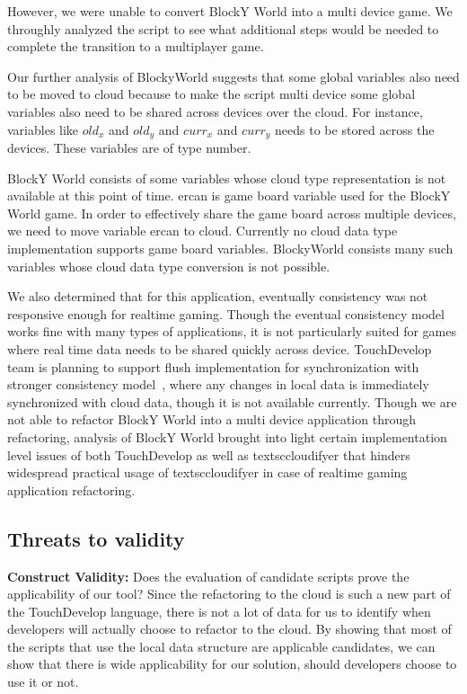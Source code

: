\documentclass{sigplanconf}
\begin{document}
However, we were unable to convert BlockY World into a multi device game.  We throughly analyzed the script to see what additional steps would be needed to complete the transition to a multiplayer game.

Our further analysis of BlockyWorld suggests that some global variables also need to be moved to cloud because to make the script multi device some global variables also need to be shared across devices over the cloud. For instance, variables like $old_x$ and $old_y$ and $curr_x$ and $curr_y$ needs to be stored across the devices. These variables are of type number.  

BlockY World consists of some variables whose cloud type representation is not available at this point of time. ercan is game board variable used for the BlockY World game. In order to effectively share the game board across multiple devices, we need to move variable ercan to cloud. Currently no cloud data type implementation supports game board variables. BlockyWorld consists many such variables whose cloud data type conversion is not possible.

We also determined that for this application, eventually consistency was not responsive enough for realtime gaming.  Though the eventual consistency model works fine with many types of applications, it is not particularly  suited for games where real time data needs to be shared quickly across device. TouchDevelop team is planning to support flush implementation for synchronization with stronger consistency model~\cite{burckhardt2012cloud}, where any changes in local data is immediately synchronized with cloud data, though it is not available currently. Though we are not able to refactor BlockY World into a multi device application through refactoring, analysis of BlockY World brought into light certain implementation level issues of both TouchDevelop as well as textsc{cloudifyer} that hinders widespread practical usage of textsc{cloudifyer} in case of realtime gaming application refactoring. 


\subsection{Threats to validity}
\textbf{Construct Validity:}  Does the evaluation of candidate scripts prove the applicability of our tool?  Since the refactoring to the cloud is such a new part of the TouchDevelop language, there is not a lot of data for us to identify when developers will actually choose to refactor to the cloud.  By showing that most of the scripts that use the local data structure are applicable candidates, we can show that there is wide applicability for our solution, should developers choose to use it or not.
\end{document}

